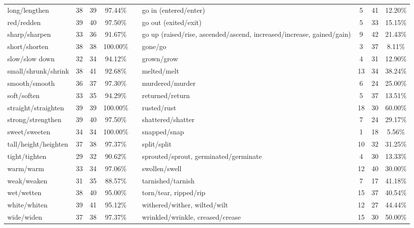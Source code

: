\begin{tabular}{p{3cm}ccccp{3cm}ccc}
long/lengthen & 38 & 39 & 97.44\% & & go in (entered/enter) & 5 & 41 & 12.20\% \\
red/redden & 39 & 40 & 97.50\% & & go out (exited/exit) & 5 & 33 & 15.15\% \\
sharp/sharpen & 33 & 36 & 91.67\% & & go up (raised/rise, ascended/ascend, increased/increase, gained/gain) & 9 & 42 & 21.43\% \\
short/shorten & 38 & 38 & 100.00\% & & gone/go & 3 & 37 & 8.11\% \\
slow/slow down & 32 & 34 & 94.12\% & & grown/grow & 4 & 31 & 12.90\% \\
small/shrunk/shrink & 38 & 41 & 92.68\% & & melted/melt & 13 & 34 & 38.24\% \\
smooth/smooth & 36 & 37 & 97.30\% & & murdered/murder & 6 & 24 & 25.00\% \\
soft/soften & 33 & 35 & 94.29\% & & returned/return & 5 & 37 & 13.51\% \\
straight/straighten & 39 & 39 & 100.00\% & & rusted/rust & 18 & 30 & 60.00\% \\
strong/strengthen & 39 & 40 & 97.50\% & & shattered/shatter & 7 & 24 & 29.17\% \\
sweet/sweeten & 34 & 34 & 100.00\% & & snapped/snap & 1 & 18 & 5.56\% \\
tall/height/heighten & 37 & 38 & 97.37\% & & split/split & 10 & 32 & 31.25\% \\
tight/tighten & 29 & 32 & 90.62\% & & sprouted/sprout, germinated/germinate & 4 & 30 & 13.33\% \\
warm/warm & 33 & 34 & 97.06\% & & swollen/swell & 12 & 40 & 30.00\% \\
weak/weaken & 31 & 35 & 88.57\% & & tarnished/tarnish & 7 & 17 & 41.18\% \\
wet/wetten & 38 & 40 & 95.00\% & & torn/tear, ripped/rip & 15 & 37 & 40.54\% \\
white/whiten & 39 & 41 & 95.12\% & & withered/wither, wilted/wilt & 12 & 27 & 44.44\% \\
wide/widen & 37 & 38 & 97.37\% & & wrinkled/wrinkle, creased/crease & 15 & 30 & 50.00\%
\end{tabular}
